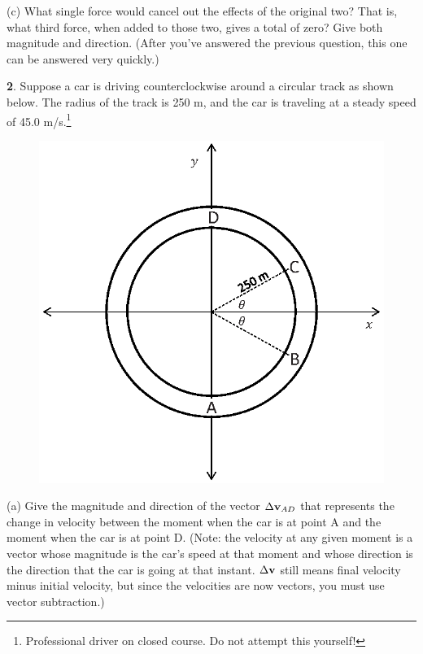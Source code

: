 (c) What single force would cancel out the effects of the original two?  That
is, what third force, when added to those two, gives a total of zero?
Give both magnitude and direction.  (After you've answered the
previous question, this one can be answered very quickly.)

\vfil\eject


{\bf 2}.  Suppose a car is driving counterclockwise around a circular track as shown
below.  The radius of the track is 250 m, and the car is traveling
at a steady speed of 45.0 m/s.\footnote{Professional driver on closed
course.  Do not attempt this yourself!}

\begin{figure}[h]
\centerline{\includegraphics{vectors/vectors_fig_new.eps}}
\end{figure}

(a) Give the magnitude and direction of the vector $\Delta{\bf v}_{AD}$
that represents the change in velocity between the moment when the
car is at point A and the moment when the car is at point D.  (Note:
the velocity at any given moment is a vector whose magnitude is the
car's speed at that moment and whose direction is the direction that
the car is going at that instant.  $\Delta{\bf v}$ still means
final velocity minus initial velocity, but since the velocities are
now vectors, you must use vector subtraction.)

